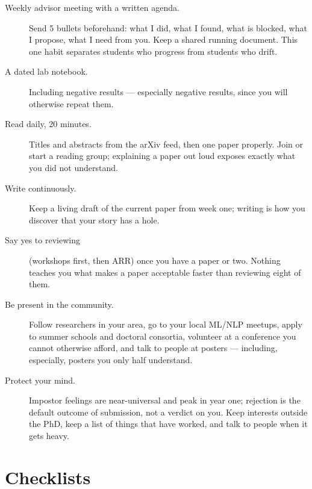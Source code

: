 \documentclass[11pt,a4paper]{article}
\begin{document}
\begin{description}
  \item[Weekly advisor meeting with a written agenda.] Send 5 bullets
        beforehand: what I did, what I found, what is blocked, what I propose,
        what I need from you. Keep a shared running document. This one habit
        separates students who progress from students who drift.
  \item[A dated lab notebook.] Including negative results --- especially
        negative results, since you will otherwise repeat them.
  \item[Read daily, 20 minutes.] Titles and abstracts from the arXiv feed,
        then one paper properly. Join or start a reading group; explaining a
        paper out loud exposes exactly what you did not understand.
  \item[Write continuously.] Keep a living draft of the current paper from
        week one; writing is how you discover that your story has a hole.
  \item[Say yes to reviewing] (workshops first, then ARR) once you have a
        paper or two. Nothing teaches you what makes a paper acceptable faster
        than reviewing eight of them.
  \item[Be present in the community.] Follow researchers in your area, go to
        your local ML/NLP meetups, apply to summer schools and doctoral
        consortia, volunteer at a conference you cannot otherwise afford, and
        talk to people at posters --- including, especially, posters you only
        half understand.
  \item[Protect your mind.] Impostor feelings are near-universal and peak in
        year one; rejection is the default outcome of submission, not a verdict
        on you. Keep interests outside the PhD, keep a list of things that have
        worked, and talk to people when it gets heavy.
\end{description}

\section{Checklists}
\end{document}

